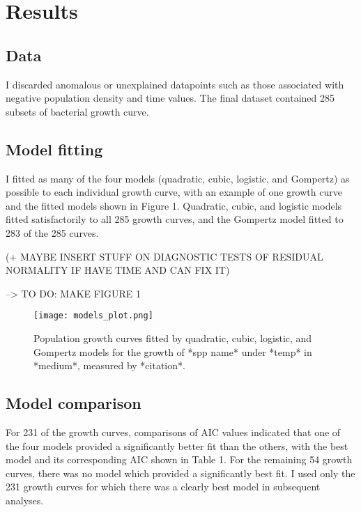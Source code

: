 \documentclass[11pt]{article}
\begin{document}
	
	
	\section{Results}
	
	\subsection{Data}
	
	I discarded anomalous or unexplained datapoints such as those associated with negative population density and time values. The final dataset contained 285 subsets of bacterial growth curve.
	
	
	\subsection{Model fitting}
	
	I fitted as many of the four models (quadratic, cubic, logistic, and Gompertz) as possible to each individual growth curve, with an example of one growth curve and the fitted models shown in Figure 1. Quadratic, cubic, and logistic models fitted satisfactorily to all 285 growth curves, and the Gompertz model fitted to 283 of the 285 curves.  
	
	(+ MAYBE INSERT STUFF ON DIAGNOSTIC TESTS OF RESIDUAL NORMALITY IF HAVE TIME AND CAN FIX IT)
	
	--> TO DO: MAKE FIGURE 1
	
	\begin{figure}[htbp]
		\centering
		\texttt{[image: models\_plot.png]}
		\caption{Population growth curves fitted by quadratic, cubic, logistic, and Gompertz models for the growth of *spp name* under *temp* in *medium*, measured by *citation*.}
		\label{fig.test1}
	\end{figure}
	
	
	\subsection{Model comparison}
	
	For 231 of the growth curves, comparisons of AIC values indicated that one of the four models provided a significantly better fit than the others, with the best model and its corresponding AIC shown in Table 1. For the remaining 54 growth curves, there was no model which provided a significantly best fit. I used only the 231 growth curves for which there was a clearly best model in subsequent analyses. 
	
\end{document}
